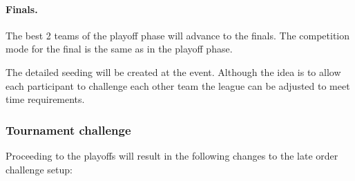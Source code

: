 \documentclass[12pt,twoside]{article}
\begin{document}
\paragraph{Finals.} The best 2 teams of the playoff phase will advance
to the finals. The competition mode for the final is the same as in
the playoff phase.

\bigskip
The detailed seeding will be created at the event. Although the idea
is to allow each participant to challenge each other team the league
can be adjusted to meet time requirements.


\subsubsection{Tournament challenge}
Proceeding to the playoffs will result in the following changes to the
late order challenge setup:
\end{document}
